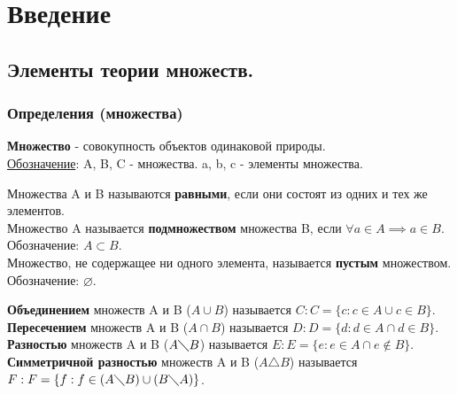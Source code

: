 \documentclass[12pt]{article}
\begin{document}
    \section{Введение}
    \subsection{Элементы теории множеств.}
    \subsubsection*{Определения (множества)}
    \noindent \textbf{Множество} - совокупность объектов одинаковой природы.\\
    \underline{Обозначение}: A, B, C - множества. a, b, c - элементы множества.\par
    \noindent Множества A и B называются \textbf{равными}, если они состоят из одних и тех же элементов.\\
    Множество A называется \textbf{подмножеством} множества B, если $\forall a \in A \implies a \in B$. Обозначение: $A \subset B$.\\
    Множество, не содержащее ни одного элемента, называется \textbf{пустым} множеством. Обозначение: $\varnothing$.\par
    \noindent \textbf{Объединением} множеств A и B ($A \cup B$) называется $C : C = \{ c : c \in A \cup c \in B \}$.\\
    \textbf{Пересечением} множеств A и B ($A \cap B$) называется $D : D = \{ d : d \in A \cap d \in B \}$.\\
    \textbf{Разностью} множеств A и B ($A \diagdown B$) называется $E : E = \{ e : e \in A \cap e \notin B \}$.\\
    \textbf{Симметричной разностью} множеств A и B ($A \triangle B$) называется $F : F = \{ f : f \in (A \diagdown B) \cup (B \diagdown A)\}$.
    \par
\end{document}
